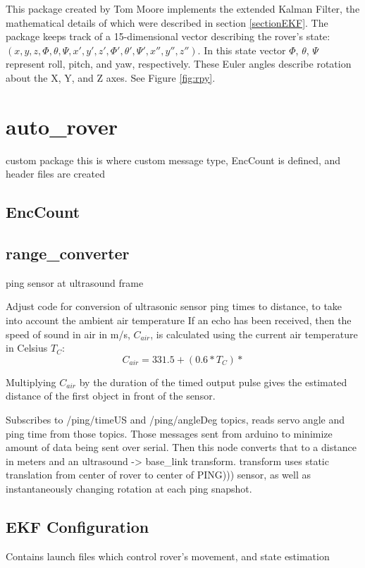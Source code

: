 This package created by Tom Moore implements the extended Kalman Filter, the mathematical details of which were described in section \ref{sectionEKF}. The package keeps track of a 15-dimensional vector describing the rover's state: \((x,y,z,\Phi,\theta,\Psi,x',y',z',\Phi ',\theta ',\Psi ', x'', y'', z'')\). In this state vector  \(\Phi\), \(\theta\), \(\Psi\) represent roll, pitch, and yaw, respectively. These Euler angles describe rotation about the X, Y, and Z axes. See Figure \ref{fig:rpy}.


\cite{robot_localization_paper}





\section{auto\_rover}
custom package
this is where custom message type, EncCount is defined, and header files are created
\subsection{EncCount} \label{sectionEncCount}

\subsection{range\_converter}
ping sensor at ultrasound frame

Adjust code for conversion of ultrasonic sensor ping times to distance, to take into account the ambient air temperature
If an echo has been received, then the speed of sound in air in m/s, \(C_{air}\), is calculated using the current air temperature in Celsius \(T_C\):
\[C_{air} = 331.5 + (0.6 * T_C)*\]

Multiplying \(C_{air}\) by the duration of the timed output pulse gives the estimated distance of the first object in front of the sensor.

Subscribes to /ping/timeUS and /ping/angleDeg topics, reads servo angle and ping time from those topics. Those messages sent from arduino to minimize amount of data being sent over serial. Then this node converts that to a distance in meters and an ultrasound -> base\_link transform. transform uses static translation from center of rover to center of PING))) sensor, as well as instantaneously changing rotation at each ping snapshot.

\subsection{EKF Configuration}
Contains launch files which control rover's movement, and state estimation

